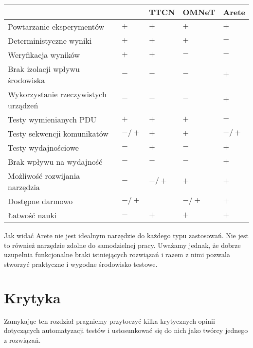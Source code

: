 \documentclass[00-praca-magisterska.tex]{subfiles}
\begin{document}
\begin{small}
\begin{center}
   \begin{tabular}{ l || C{1.6cm} | C{1.6cm} | C{1.6cm} | C{1.6cm}   }
      \hline
      & \small{\parbox[top][3.4em][c]{1.6cm}{}} & \small{TTCN} & \small{OMNeT} & \small{Arete} \\
      \hline
      Powtarzanie eksperymentów & $+$ & $+$ & $+$ & $+$ \\
      \hline
      Deterministyczne wyniki & $+$ & $+$ & $+$ & $-$ \\
      \hline
      Weryfikacja wyników & $+$ & $+$ & $-$ & $-$ \\
      \hline
      Brak izolacji wpływu środowiska & $-$ & $-$ & $-$ & $+$ \\
      \hline
      Wykorzystanie rzeczywistych urządzeń & $-$ & $-$ & $-$ & $+$ \\
      \hline
      Testy wymienianych PDU & $+$ & $+$ & $+$ & $-$ \\
      \hline
      Testy sekwencji komunikatów & $-/+$ & $+$ & $+$ & $-/+$ \\
      \hline
      Testy wydajnościowe & $-$ & $+$ & $-$ & $+$ \\
      \hline
      Brak wpływu na wydajność & $-$ & $-$ & $-$ & $+$ \\
      \hline
      Możliwość rozwijania narzędzia & $-$ & $-/+$ & $+$ & $+$ \\
      \hline
      Dostępne darmowo & $-/+$ & $-$ & $-/+$ & $+$ \\
      \hline
      Łatwość nauki & $-$ &  $+$ & $+$ & $+$ \\
      \hline

  \end{tabular}
\end{center}
\end{small}

Jak widać Arete nie jest idealnym narzędzie do każdego typu zastosowań. Nie
jest to również narzędzie zdolne do samodzielnej pracy.  Uważamy jednak, że
dobrze uzupełnia funkcjonalne braki istniejących rozwiązań i razem z nimi
pozwala stworzyć praktyczne i wygodne środowisko testowe.

\section{Krytyka}

Zamykając ten rozdział pragniemy przytoczyć kilka krytycznych opinii
dotyczących automatyzacji testów i ustosunkować się do nich jako twórcy jednego
z rozwiązań.
\end{document}
